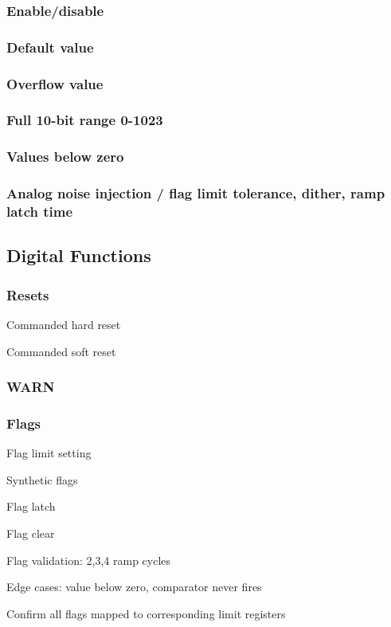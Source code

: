 \documentclass[11pt]{article}   			%
\begin{document}
\subsubsection{Enable/disable}

\subsubsection{Default value}

\subsubsection{Overflow value}

\subsubsection{Full 10-bit range 0-1023}

\subsubsection{Values below zero}

\subsubsection{Analog noise injection / flag limit tolerance, dither, ramp latch time}

\subsection{Digital Functions}

\subsubsection{Resets}
\begin{compactitem}
    \item{Commanded hard reset}
    \item{Commanded soft reset}
\end{compactitem}

\subsubsection{WARN}

\subsubsection{Flags}
\begin{compactitem}
    \item{Flag limit setting}
    \item{Synthetic flags}
    \item{Flag latch}
    \item{Flag clear}
    \item{Flag validation: 2,3,4 ramp cycles}
    \item{Edge cases: value below zero, comparator never fires}
    \item{Confirm all flags mapped to corresponding limit registers}
\end{compactitem}
\end{document}
